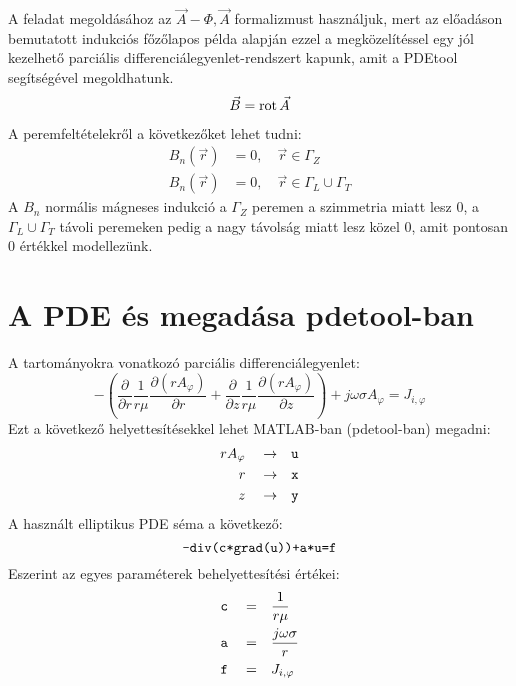 A feladat megoldásához az $\vec{A}-\Phi, \vec{A}$ formalizmust használjuk, mert az előadáson bemutatott indukciós főzőlapos példa alapján ezzel a megközelítéssel egy jól kezelhető parciális differenciálegyenlet-rendszert kapunk, amit a PDEtool segítségével megoldhatunk.
\begin{align}
    \vec{B} = \operatorname{rot} \vec{A}
\end{align}
A peremfeltételekről a következőket lehet tudni:
\begin{align}
    B_n(\vec{r}) &= 0, \quad \vec{r} \in \Gamma_Z\\
    B_n(\vec{r}) &= 0, \quad \vec{r} \in \Gamma_L \cup \Gamma_T
\end{align}
A $B_n$ normális mágneses indukció a $\Gamma_Z$ peremen a szimmetria miatt lesz 0, a $\Gamma_L \cup \Gamma_T$ távoli peremeken pedig a nagy távolság miatt lesz közel 0, amit pontosan 0 értékkel modellezünk.
\section{A PDE és megadása pdetool-ban}
A tartományokra vonatkozó parciális differenciálegyenlet:
\begin{equation}
    -\left(\dfrac{\partial}{\partial r}\dfrac{1}{r\mu}\dfrac{\partial(rA_{\varphi})}{\partial r}+\dfrac{\partial}{\partial z}\dfrac{1}{r\mu}\dfrac{\partial(rA_{\varphi})}{\partial z}\right) + j\omega\sigma A_{\varphi} = J_{i,\varphi}
\end{equation}
Ezt a következő helyettesítésekkel lehet MATLAB-ban (pdetool-ban) megadni:
\begin{equation}
    \begin{aligned}
        rA_{\varphi}\quad\rightarrow&\quad\verb|u|\\
        r\quad\rightarrow&\quad\verb|x|\\
        z\quad\rightarrow&\quad\verb|y|
    \end{aligned}
\end{equation}
A használt elliptikus PDE séma a következő:
\begin{equation}
    \verb|-div(c*grad(u))+a*u=f|
\end{equation}
Eszerint az egyes paraméterek behelyettesítési értékei:
\begin{equation}
    \begin{aligned}
        \verb|c|\quad=&\quad\dfrac{1}{r\mu}\\
        \verb|a|\quad=&\quad\dfrac{j\omega\sigma}{r}\\
        \verb|f|\quad=&\quad J_{i,\varphi}
    \end{aligned}
\end{equation}
